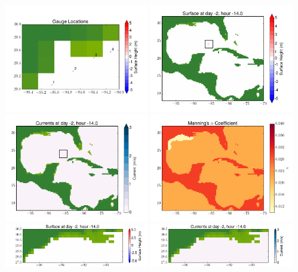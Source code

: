\documentclass[11pt]{article}
\begin{document}
\includegraphics[width=0.475\textwidth]{frame0009fig10.png}
\vskip 10pt 
\includegraphics[width=0.475\textwidth]{frame0010fig1.png}
\includegraphics[width=0.475\textwidth]{frame0010fig2.png}
\vskip 10pt 
\includegraphics[width=0.475\textwidth]{frame0010fig3.png}
\includegraphics[width=0.475\textwidth]{frame0010fig4.png}
\vskip 10pt 
\includegraphics[width=0.475\textwidth]{frame0010fig5.png}
\end{document}
